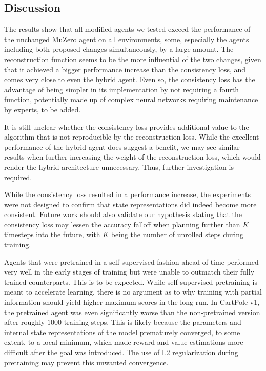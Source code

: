\subsection{Discussion}
The results show that all modified agents we tested exceed the performance of the unchanged MuZero agent on all environments, some, especially the agents including both proposed changes simultaneously, by a large amount. The reconstruction function seems to be the more influential of the two changes, given that it achieved a bigger performance increase than the consistency loss, and comes very close to even the hybrid agent. Even so, the consistency loss has the advantage of being simpler in its implementation by not requiring a fourth function, potentially made up of complex neural networks requiring maintenance by experts, to be added.

It is still unclear whether the consistency loss provides additional value to the algorithm that is not reproducible by the reconstruction loss. While the excellent performance of the hybrid agent does suggest a benefit, we may see similar results when further increasing the weight of the reconstruction loss, which would render the hybrid architecture unnecessary. Thus, further investigation is required.

While the consistency loss resulted in a performance increase, the experiments were not designed to confirm that state representations did indeed become more consistent. Future work should also validate our hypothesis stating that the consistency loss may lessen the accuracy falloff when planning further than $K$ timesteps into the future, with $K$ being the number of unrolled steps during training.

Agents that were pretrained in a self-supervised fashion ahead of time performed very well in the early stages of training but were unable to outmatch their fully trained counterparts. This is to be expected. While self-supervised pretraining is meant to accelerate learning, there is no argument as to why training with partial information should yield higher maximum scores in the long run. In CartPole-v1, the pretrained agent was even significantly worse than the non-pretrained version after roughly $1000$ training steps. This is likely because the parameters and internal state representations of the model prematurely converged, to some extent, to a local minimum, which made reward and value estimations more difficult after the goal was introduced. The use of L2 regularization during pretraining may prevent this unwanted convergence.